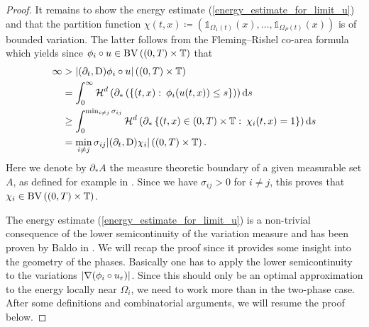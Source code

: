 \begin{proof}
 	It remains to show the energy estimate 
 	(\ref{energy_estimate_for_limit_u}) and that the
 	 partition function $ \chi 
 	( t , x ) \coloneqq \left( \mathds{ 1 }_{ \Omega_{ 1 } ( t )  } ( x ) , 
 	\dotsc, \mathds{ 1 }_{ \Omega_{ P } ( t ) } ( x ) \right) $ is of bounded 
 	variation.
 	The latter follows from the Fleming--Rishel co-area formula \cite{Fleming_Rishel_coarea_formula} which yields since $ \phi_{ i } \circ u \in \operatorname{BV} \left( ( 0 , T ) \times \operatorname{\mathbb{T}} \right) $ that
 	\begin{align*}
 		\infty
 		& >
 		\abs{ 
 			( \partial_{ t } , \mathrm{D} )
 			\phi_{ i } \circ u
 		}
 		\left( ( 0 , T ) \times \operatorname{\mathbb{T}} \right)
 		\\
 		&
 		=
 		\int_{ 0 }^{ \infty }
 			\operatorname{\mathcal{H}}^{ d } \left(
 				\partial_{ \ast } \left(
 					\left\{
 						( t, x ) 
 						\, \colon \,
 						\phi_{ i } ( u ( t , x ) ) \leq s 
 					\right\}
 				 \right)
 			\right)
 		\dd{ s }
 		\\
 		&
 		\geq
 		\int_{ 0 }^{ \min_{ i \neq j } \sigma_{ i j } }
 			\operatorname{\mathcal{H}}^{ d } \left(
 				\partial_{ \ast }
 				\left\{
 					( t , x ) \in ( 0 , T ) \times \operatorname{\mathbb{T}} 
 					\, \colon \,
 					\chi_{ i } ( t , x ) = 1
 				\right\}
 			\right)
 		\dd{ s }
 		\\
 		&=
 		\min_{ i \neq j }
 			\sigma_{ i j }
 		\abs{
 			( \partial_{ t } , \mathrm{D} ) \chi_{ i }
 		}
 		\left(
 			( 0 , T ) \times \operatorname{\mathbb{T}}
 		\right).
 	\end{align*}
 	Here we denote by $ \partial_{ \ast } A $ the measure theoretic boundary of a given measurable set $ A $, as defined for example in \cite[Def.~5.7]{evans_gariepy_measure_theory_and_fine_props}.
 	Since we have $ \sigma_{ i j } > 0 $ for $ i \neq j $, this proves that $ 
 	\chi_{ i } \in \operatorname{BV} \left( ( 0, T ) \times \operatorname{\mathbb{T}} \right) $.
 	
 	The energy estimate (\ref{energy_estimate_for_limit_u}) is a non-trivial 
 	consequence of the lower semicontinuity of the variation measure and has 
 	been proven by Baldo in \cite{baldo_minimal_interface_criterion}. We will 
 	recap the proof since it provides some insight into the geometry of the 
 	phases. Basically one has to apply the lower semicontinuity to the 
 	variations $ \abs{ \nabla ( \phi_{ i } \circ u_{ \varepsilon } ) } $. Since 
 	this should only be an optimal approximation to the energy locally near $ 
 	\Omega_{ i} $, we need to work more than in the two-phase case.
 	After some definitions and combinatorial arguments, we will resume the 
 	proof below.
\end{proof}

